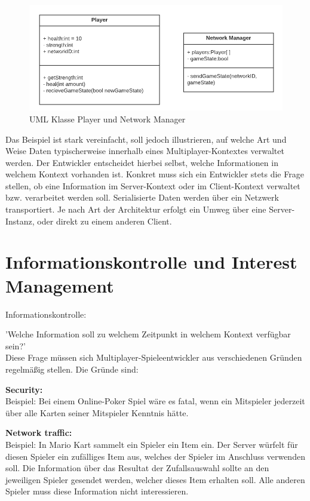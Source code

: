 \begin{figure}[H]
	\centering
	\includegraphics[width=150mm]{images/UML_class_Player_NM.png}
	\caption[UML Klassen]{UML Klasse Player und Network Manager}
	\label{pic:UML_class_Player_NM}
\end{figure}

Das Beispiel ist stark vereinfacht, soll jedoch illustrieren, auf welche Art und Weise Daten typischerweise innerhalb eines Multiplayer-Kontextes verwaltet werden. Der Entwickler entscheidet hierbei selbst, welche Informationen in welchem Kontext vorhanden ist. Konkret muss sich ein Entwickler stets die Frage stellen, ob eine Information im Server-Kontext oder im Client-Kontext verwaltet bzw. verarbeitet werden soll. Serialisierte Daten werden über ein Netzwerk transportiert. Je nach Art der Architektur erfolgt ein Umweg über eine Server-Instanz, oder direkt zu einem anderen Client. \cite{Smed.2002c}

\section{Informationskontrolle und Interest Management}

\textsf{\Large Informationskontrolle:}

'Welche Information soll zu welchem Zeitpunkt in welchem Kontext verfügbar sein?' \\
Diese Frage müssen sich Multiplayer-Spieleentwickler aus verschiedenen Gründen regelmäßig stellen. Die Gründe sind:

\textbf{Security:} \\
Beispiel: Bei einem Online-Poker Spiel wäre es fatal, wenn ein Mitspieler jederzeit über alle Karten seiner Mitspieler Kenntnis hätte. 

\textbf{Network traffic:} \\
Beispiel: In Mario Kart sammelt ein Spieler ein Item ein. Der Server würfelt für diesen Spieler ein zufälliges Item aus, welches der Spieler im Anschluss verwenden soll. Die Information über das Resultat der Zufallsauswahl sollte an den jeweiligen Spieler gesendet werden, welcher dieses Item erhalten soll. Alle anderen Spieler muss diese Information nicht interessieren.
 
